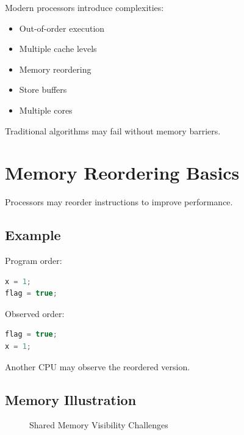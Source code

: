 Modern processors introduce complexities:

\begin{itemize}
\item Out-of-order execution
\item Multiple cache levels
\item Memory reordering
\item Store buffers
\item Multiple cores
\end{itemize}

Traditional algorithms may fail without memory barriers.

\section{Memory Reordering Basics}

Processors may reorder instructions to improve performance.

\subsection{Example}

Program order:

\begin{lstlisting}[language=C++,style=interviewcode]
x = 1;
flag = true;
\end{lstlisting}

Observed order:

\begin{lstlisting}[language=C++,style=interviewcode]
flag = true;
x = 1;
\end{lstlisting}

Another CPU may observe the reordered version.

\subsection{Memory Illustration}

\begin{figure}[H]
\centering
{}
\caption{Shared Memory Visibility Challenges}
\end{figure}

